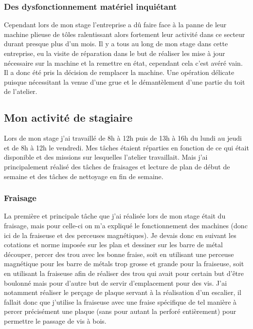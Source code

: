 \subsubsection{Des dysfonctionnement matériel inquiétant}%
Cependant lors de mon stage l'entreprise a dû faire face à la panne de leur machine plieuse de tôles ralentissant alors fortement leur activité dans ce secteur durant presque plus d'un mois. Il y a tous au long de mon stage dans cette entreprise, eu la visite de réparation dans le but de réaliser les mise à jour nécessaire sur la machine et la remettre en état, cependant cela c'est avéré vain. Il a donc été pris la décision de remplacer la machine. Une opération délicate puisque nécessitant la venue d'une grue et le démantèlement d'une partie du toit de l'atelier.


\subsection{Mon activité de stagiaire}

Lors de mon stage j'ai travaillé de 8h à 12h puis de 13h à 16h du lundi au jeudi et de 8h à 12h le vendredi. Mes tâches étaient réparties en fonction de ce qui était disponible et des missions sur lesquelles l'atelier travaillait. Mais j'ai principalement réalisé des tâches de fraisages et lecture de plan de début de semaine et des tâches de nettoyage en fin de semaine.
\subsubsection{Fraisage}
La première et principale tâche que j'ai réalisée lors de mon stage était du fraisage, mais pour celle-ci on m'a expliqué le fonctionnement des machines (donc ici de la fraiseuse et des perceuses magnétiques). Je devais donc en suivant les cotations et norme imposée sur les plan et dessiner sur les barre de métal découper, percer des trou avec les bonne fraise, soit en utilisant une perceuse magnétique pour les barre de métals trop grosse et grande pour la fraiseuse, soit en utilisant la fraiseuse afin de réaliser des trou qui avait pour certain but d'être boulonné mais pour d'autre but de servir d'emplacement pour des vis. J'ai notamment réaliser le perçage de plaque servant à la réalisation d'un escalier, il fallait donc que j'utilise la fraiseuse avec une fraise spécifique de tel manière à percer précisément une plaque (sans pour autant la perforé entièrement) pour permettre le passage de vis à bois.
